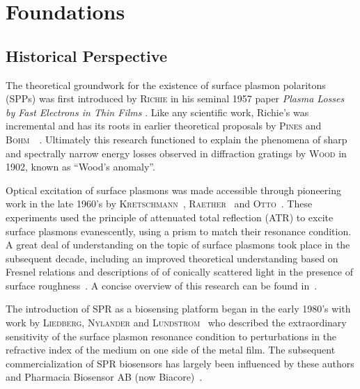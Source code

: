 \documentclass[a4paper,titlepage,onecolumn]{report}
\newcommand{\name}[1]{\textsc{#1}}
\begin{document}
\chapter{Foundations}
\section{Historical Perspective}
The theoretical groundwork for the existence of surface plasmon polaritons
(SPPs) was first introduced by \name{Richie} in his seminal 1957 paper
\textit{Plasma Losses by Fast Electrons in Thin Films}
\cite{ritchie1957plasma}.  Like any scientific work, Richie's was
incremental and has its roots in earlier theoretical proposals by
\name{Pines} and
\name{Bohm}~\cite{bohm1951collective}~\cite{pines1952collective}.
Ultimately this research functioned to explain the phenomena of sharp and
spectrally narrow energy losses observed in diffraction gratings by
\name{Wood} in 1902, known as ``Wood's anomaly''.

Optical excitation of surface plasmons was made accessible through
pioneering work in the late 1960's by
\name{Kretschmann}~\cite{kretschmann1968},
\name{Raether}~\cite{raether1965springer} and
\name{Otto}~\cite{otto1968excitation}.  These experiments used the
principle of attenuated total reflection (ATR) to excite surface plasmons
evanescently, using a prism to match their resonance condition.  A great
deal of understanding on the topic of surface plasmons took place in the
subsequent decade, including an improved theoretical understanding based on
Fresnel relations \cite{chen1976excitation} and descriptions of of
conically scattered light in the presence of surface
roughness~\cite{simon1976directional}.  A concise overview of this research
can be found in~\cite{raether1997surface}.

The introduction of SPR as a biosensing platform began in the early 1980's
with work by \name{Liedberg}, \name{Nylander} and
\name{Lundstrom}~\cite{liedberg1983surface} who described the
extraordinary sensitivity of the surface plasmon resonance condition to
perturbations in the refractive index of the medium on one side of the
metal film.  The subsequent commercialization of SPR biosensors has largely
been influenced by these authors and Pharmacia Biosensor AB (now
Biacore)~\cite{liedberg1995biosensing}.
\end{document}
